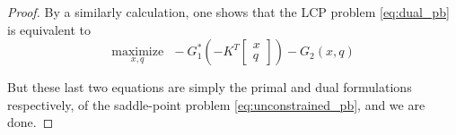 \documentclass{article} %
\begin{document}
\begin{proof}
By a similarly calculation, one shows that the LCP problem \eqref{eq:dual_pb} is equivalent to
\begin{equation}
  \underset{x,q}{\text{maximize}}\text{ }-G_1^*\left(-K^T\begin{bmatrix}x\\q\end{bmatrix}\right) - G_2(x, q)
\end{equation}

But these last two equations are simply the primal and dual formulations respectively, of the saddle-point problem \eqref{eq:unconstrained_pb}, and we are done.


\end{proof}
\end{document}
